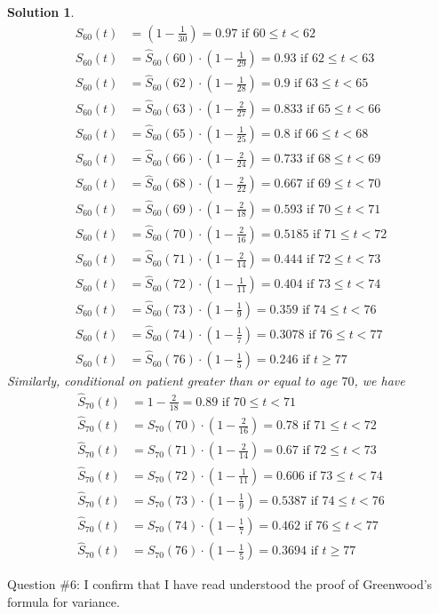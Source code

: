\documentclass[11pt]{article}
\newtheorem{sol}{Solution}
\begin{document}
\begin{sol}
		\begin{align*}
			\hat{S}_{60}(t) &= (1 - \frac{1}{30}) = 0.97 \text{ if } 60 \leq t < 62\\
			\hat{S}_{60}(t) &= \hat{S}_{60}(60)\cdot (1 - \frac{1}{29}) = 0.93 \text{ if }62 \leq t < 63\\
			\hat{S}_{60}(t) &=\hat{S}_{60}(62)\cdot (1 - \frac{1}{28}) =  0.9 \text{ if } 63 \leq t < 65\\
			\hat{S}_{60}(t) &= \hat{S}_{60}(63)\cdot (1 - \frac{2}{27}) = 0.833\text{ if } 65 \leq t < 66\\
			\hat{S}_{60}(t) &= \hat{S}_{60}(65)\cdot (1 - \frac{1}{25}) = 0.8 \text{ if } 66 \leq t < 68\\
			\hat{S}_{60}(t) &= \hat{S}_{60}(66)\cdot (1 - \frac{2}{24}) = 0.733 \text{ if } 68 \leq t< 69\\
			\hat{S}_{60}(t) &= \hat{S}_{60}(68)\cdot (1 - \frac{2}{22}) = 0.667 \text{ if }69 \leq t < 70\\
			\hat{S}_{60}(t) &= \hat{S}_{60}(69) \cdot (1 - \frac{2}{18}) = 0.593 \text{ if } 70 \leq t < 71\\
			\hat{S}_{60}(t) &= \hat{S}_{60}(70)\cdot (1 - \frac{2}{16}) = 0.5185 \text{ if } 71 \leq t < 72\\
			\hat{S}_{60}(t) &= \hat{S}_{60}(71)\cdot (1 - \frac{2}{14}) = 0.444 \text{ if }72 \leq t < 73\\
			\hat{S}_{60}(t)&= \hat{S}_{60}(72)\cdot (1 - \frac{1}{11}) = 0.404 \text{ if } 73 \leq t < 74\\
			\hat{S}_{60}(t) &= \hat{S}_{60}(73)\cdot (1 - \frac{1}{9}) =0.359 \text{ if }74 \leq t < 76\\
			\hat{S}_{60}(t) &= \hat{S}_{60}(74)\cdot (1 - \frac{1}{7}) = 0.3078 \text{ if }76 \leq t < 77\\
			\hat{S}_{60}(t) &= \hat{S}_{60}(76)\cdot (1 - \frac{1}{5}) = 0.246\text{ if }t \geq 77
		\end{align*}
	Similarly, conditional on patient greater than or equal to age $70$, we have
	\begin{align*}
		\hat{S}_{70}(t) &= 1 - \frac{2}{18} = 0.89 \text{ if } 70 \leq t < 71\\
		\hat{S}_{70}(t) &= \hat{S}_{70}(70)\cdot (1 - \frac{2}{16}) = 0.78 \text{ if }71 \leq t < 72\\
		\hat{S}_{70}(t) &= \hat{S}_{70}(71) \cdot (1 - \frac{2}{14}) =0.67 \text{    if } 72 \leq t < 73\\
		\hat{S}_{70}(t) &= \hat{S}_{70}(72)\cdot (1 - \frac{1}{11}) =  0.606 \text{ if }73 \leq t < 74\\
		\hat{S}_{70}(t) &= \hat{S}_{70}(73)\cdot (1 - \frac{1}{9}) =0.5387 \text{ if }74 \leq t < 76\\
		\hat{S}_{70}(t) &= \hat{S}_{70}(74)\cdot (1 - \frac{1}{7}) = 0.462 \text{ if }76 \leq t  < 77\\
		\hat{S}_{70}(t) &= \hat{S}_{70}(76)\cdot (1 - \frac{1}{5}) = 0.3694 \text{ if } t \geq 77
	\end{align*}
\end{sol}

Question $\#6$:\vskip 2mm
I confirm that I have read understood the proof of Greenwood's formula for variance.
\end{document}
